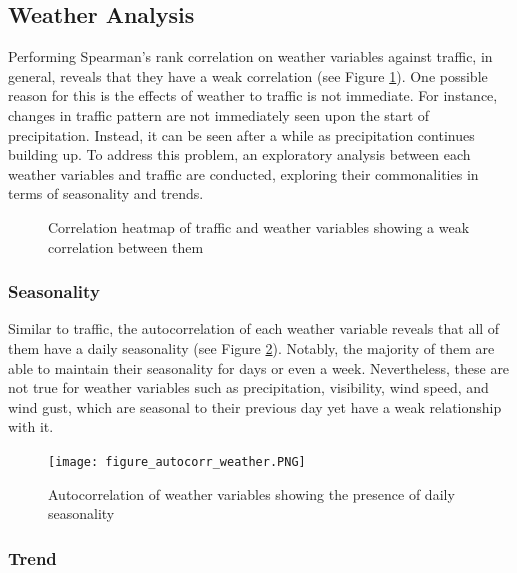 \subsection{Weather Analysis}

Performing Spearman's rank correlation on weather variables against traffic, in general, reveals that they have a weak correlation (see Figure \ref{figure_corr_trafficweather}). One possible reason for this is the effects of weather to traffic is not immediate. For instance, changes in traffic pattern are not immediately seen upon the start of precipitation. Instead, it can be seen after a while as precipitation continues building up. To address this problem, an exploratory analysis between each weather variables and traffic are conducted, exploring their commonalities in terms of seasonality and trends.


\begin{figure}[h]
  \centering
  \captionsetup{justification=centering}
  \caption{Correlation heatmap of traffic and weather variables showing a weak correlation between them}
\label{figure_corr_trafficweather}
\end{figure}



\subsubsection{Seasonality}

Similar to traffic, the autocorrelation of each weather variable reveals that all of them have a daily seasonality (see Figure \ref{figure_autocorr_weather}). Notably, the majority of them are able to maintain their seasonality for days or even a week. Nevertheless, these are not true for weather variables such as precipitation, visibility, wind speed, and wind gust, which are seasonal to their previous day yet have a weak relationship with it.


\begin{figure}[h]
  \centering
  \captionsetup{justification=centering}
  \texttt{[image: figure\_autocorr\_weather.PNG]}
  \caption{Autocorrelation of weather variables showing the presence of daily seasonality}
\label{figure_autocorr_weather}
\end{figure}


\subsubsection{Trend}

